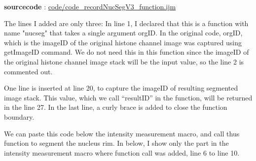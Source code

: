 \textbf{sourcecode} : \href{http://www.example.com/contents}{code/code\_recordNucSegV3\_function.ijm}

The lines I added are only three: In line 1, I declared that this is a function with name "nucseg" that takes a single argument orgID. In the original code, orgID, which is the imageID of the original histone channel image was captured using getImageID command. We do not need this in this function since the imageID of the original histone channel image stack will be the input value, so the line 2 is commented out.

One line is inserted at line 20, to capture the imageID of resulting segmented image stack. This value, which we call ``resultID'' in the function, will be returned in the line 27. In the last line, a curly brace is added to close the function boundary.

We can paste this code below the intensity measurement macro, and call thus function to segment the nucleus rim. In below, I show only the part in the intensity measurement macro where function call was added, line 6 to line 10.